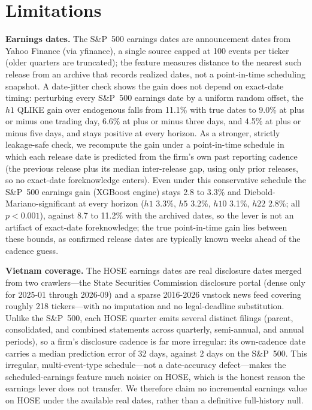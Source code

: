 \documentclass[runningheads]{llncs}
\begin{document}
\section{Limitations}
\noindent\textbf{Earnings dates.} The S\&P~500 earnings dates are announcement dates from Yahoo Finance
(via yfinance), a single source capped at 100 events per ticker (older quarters are truncated); the
feature measures distance to the nearest such release from an archive that records realized dates, not a
point-in-time scheduling snapshot. A
date-jitter check shows the gain does not depend on exact-date timing: perturbing every S\&P~500
earnings date by a uniform random offset, the $h1$ QLIKE gain over endogenous falls from 11.1\% with
true dates to 9.0\% at plus or minus one trading day, 6.6\% at plus or minus three days, and 4.5\% at
plus or minus five days, and stays positive at every horizon. As a stronger, strictly leakage-safe
check, we recompute the gain under a point-in-time schedule in which each release date is predicted from
the firm's own past reporting cadence (the previous release plus its median inter-release gap, using only
prior releases, so no exact-date foreknowledge enters). Even under this conservative schedule the
S\&P~500 earnings gain (XGBoost engine) stays 2.8 to 3.3\% and Diebold-Mariano-significant at every
horizon ($h1$ 3.3\%, $h5$ 3.2\%, $h10$ 3.1\%, $h22$ 2.8\%; all $p<0.001$), against 8.7 to 11.2\% with the
archived dates, so the lever is not an artifact of exact-date foreknowledge; the true point-in-time gain
lies between these bounds, as confirmed release dates are typically known weeks ahead of the cadence guess.

\noindent\textbf{Vietnam coverage.} The HOSE earnings dates are real disclosure dates merged from two
crawlers---the State Securities Commission disclosure portal (dense only for 2025-01 through 2026-09) and
a sparse 2016-2026 vnstock news feed covering roughly 218 tickers---with no imputation and no
legal-deadline substitution. Unlike the S\&P~500, each HOSE quarter emits several distinct filings
(parent, consolidated, and combined statements across quarterly, semi-annual, and annual periods), so a
firm's disclosure cadence is far more irregular: its own-cadence date carries a median prediction error of
32 days, against 2 days on the S\&P~500. This irregular, multi-event-type schedule---not a date-accuracy
defect---makes the scheduled-earnings feature much noisier on HOSE, which is the honest reason the earnings
lever does not transfer. We therefore claim no incremental earnings value on HOSE under the available real
dates, rather than a definitive full-history null.
\end{document}
